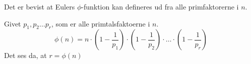 Det er bevist at Eulers \(\phi\)-funktion kan defineres ud fra alle primfaktorerne i \(n\).

\begin{sent}
    Givet \(p_1, p_2 \hdots p_r\), som er alle primtalsfaktoerne i \(n\).
    \[\phi(n) = n \cdot \left(1-\frac{1}{p_1}\right) \cdot \left(1-\frac{1}{p_2}\right) \cdot \hdots \cdot \left(1-\frac{1}{p_r}\right)\]
    Det ses da, at \(r = \phi(n)\)
\end{sent}
